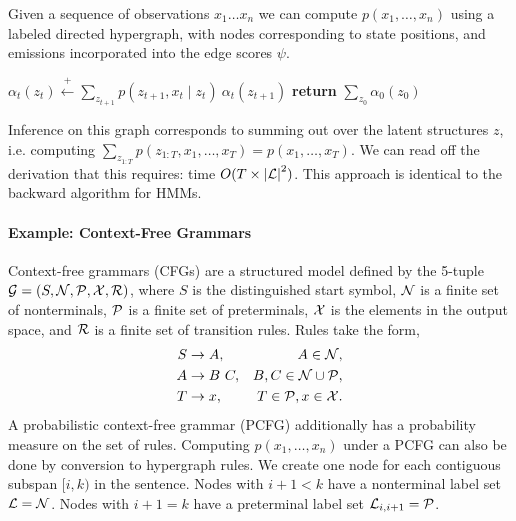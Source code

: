 \documentclass{article}
\begin{document}
Given a sequence of observations $x_1 \ldots x_n$ we can compute 
$p(x_1, \ldots, x_n)$ using a labeled directed hypergraph, with nodes corresponding to state positions, and emissions incorporated into the edge scores $\psi$. 

\begin{algorithm}
\begin{algorithmic} 
\STATE $\alpha_t(z_t) \stackrel{+}{\gets}  \displaystyle \sum_{z_{t+1}}  p(z_{t+1}, x_t \mid z_{t}) \  \alpha_{t}(z_{t+1})$
\ENDFOR
\ENDFOR
\STATE \textbf{return} $\sum_{z_0} \alpha_0(z_0)$
\end{algorithmic} 
\end{algorithm}




Inference on this graph corresponds to summing out over the latent structures $z$, i.e. 
computing $\sum_{z_{1:T}} p(z_{1:T}, x_1, \ldots, x_T) = p(x_1, \ldots, x_T)$. We 
can read off the derivation that this requires: time $O(T \times {|\cal L|}^2)$. This approach is identical to the backward algorithm for HMMs.

\paragraph{Example: Context-Free Grammars}


Context-free grammars (CFGs) are a structured model defined by the 5-tuple 
$\mathcal{G} = (S,\mathcal{N},\mathcal{P},\mathcal{X},\mathcal{R})$, where $S$ is the distinguished start symbol, $\mathcal{N}$ is a finite set of nonterminals, $\mathcal{P}$ is a finite set of preterminals, $\mathcal{X}$ is the elements in the output space, and $\mathcal{R}$ is a finite set of transition rules.
Rules take the form,
\begin{equation}
\label{eqn:pcfg-rules}
\begin{aligned}
S&\to A, & A\in\mathcal{N},\\
A&\to B\ C, & B,C\in\mathcal{N}\cup\mathcal{P},\\
T&\to x, & T \in\mathcal{P},x\in\mathcal{X}.
\end{aligned}
\end{equation}
A probabilistic context-free grammar (PCFG) additionally has a probability measure on the set of rules.
Computing $p(x_1, \ldots, x_n)$ under a PCFG can also be done by
conversion to hypergraph rules. We create one node for each contiguous
 subspan $[i, k)$ in the sentence. Nodes with $i + 1 < k$ have a
nonterminal label set ${\cal L} = \mathcal{N}$. Nodes with $i + 1= k $ have a 
preterminal label set ${\cal L}_{i,i+1} = \mathcal{P}$. 
\end{document}
